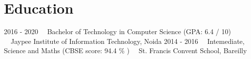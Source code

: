 \documentclass[letterpaper]{twentysecondcv} %
\begin{document}
\makeprofile %

\section{Education}

\begin{twenty} %
	\twentyitem
    	{2016 - 2020}
        {}
        {~~Bachelor of Technology in Computer Science \textnormal{(GPA: 6.4 / 10)}}
        {{}{}}
        {{}{~~Jaypee Institute of Information Technology, Noida}}
        {}
	\twentyitem
    	{2014 - 2016}
		{}
        {~~Intemediate, Science and Maths \textnormal{(CBSE score: 94.4 \% )}}
        {}
        {{}{~~St. Francis Convent School, Bareilly}}
        {}
\end{twenty}
\end{document}
